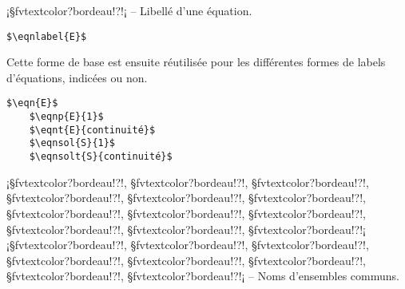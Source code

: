 \documentclass[11pt,a4paper,rgb]{report}
\begin{document}
\inCodeStub¡§fvtextcolor?bordeau!?!¡ -- Libellé d'une équation.

\setlength{\leftskip}{.75cm}%
\setlength{\textwidth}{17.25cm}%

\colorbox{blue!15}{}
\hfill
\begin{minipage}{.65\textwidth}
	\begin{lstlisting}[linewidth=\textwidth, language={[LaTeX]TeX}]
	$\eqnlabel{E}$
	\end{lstlisting}
\end{minipage}

Cette forme de base est ensuite réutilisée pour les différentes formes de labels d'équations, indicées ou non.

\colorbox{blue!15}{}
\hfill
\begin{minipage}{.65\textwidth}
	\begin{lstlisting}[linewidth=\textwidth, language={[LaTeX]TeX}]
	$\eqn{E}$
	$\eqnp{E}{1}$
	$\eqnt{E}{continuité}$
	$\eqnsol{S}{1}$
	$\eqnsolt{S}{continuité}$
	\end{lstlisting}
\end{minipage}

\setlength{\leftskip}{0pt}
\setlength{\textwidth}{18cm}%


\vspace*{.75cm}

\inCodeStub¡§fvtextcolor?bordeau!?\cc{}!, §fvtextcolor?bordeau!?\cce{}!, §fvtextcolor?bordeau!?\ccd{}!, §fvtextcolor?bordeau!?\nn{}!, §fvtextcolor?bordeau!?\nne{}!, §fvtextcolor?bordeau!?\nnd{}!, §fvtextcolor?bordeau!?\qq{}!, §fvtextcolor?bordeau!?\uu{}!, §fvtextcolor?bordeau!?\kk{}!, §fvtextcolor?bordeau!?\pp{}!, §fvtextcolor?bordeau!?\rrp{}!, §fvtextcolor?bordeau!?\rr{}!¡\newline
\inCodeStub¡§fvtextcolor?bordeau!?\rrd{}!, §fvtextcolor?bordeau!?\rrm{}!, §fvtextcolor?bordeau!?\rrpe{}!, §fvtextcolor?bordeau!?\rrme{}!, §fvtextcolor?bordeau!?\rre{}!, §fvtextcolor?bordeau!?\zz{}!, §fvtextcolor?bordeau!?\zzd{}!, §fvtextcolor?bordeau!?\zze{}!¡ -- Noms d'ensembles communs.

\setlength{\leftskip}{.75cm}%
\setlength{\textwidth}{17.25cm}%
\end{document}
